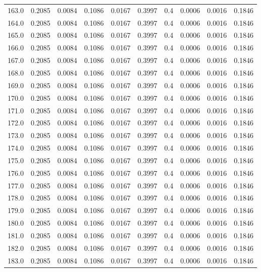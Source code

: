 \begin{longtable}{lrrrrrrrrr}
163.0 & 0.2085 & 0.0084 & 0.1086 & 0.0167 & 0.3997 & 0.4 & 0.0006 & 0.0016 & 0.1846 \\
164.0 & 0.2085 & 0.0084 & 0.1086 & 0.0167 & 0.3997 & 0.4 & 0.0006 & 0.0016 & 0.1846 \\
165.0 & 0.2085 & 0.0084 & 0.1086 & 0.0167 & 0.3997 & 0.4 & 0.0006 & 0.0016 & 0.1846 \\
166.0 & 0.2085 & 0.0084 & 0.1086 & 0.0167 & 0.3997 & 0.4 & 0.0006 & 0.0016 & 0.1846 \\
167.0 & 0.2085 & 0.0084 & 0.1086 & 0.0167 & 0.3997 & 0.4 & 0.0006 & 0.0016 & 0.1846 \\
168.0 & 0.2085 & 0.0084 & 0.1086 & 0.0167 & 0.3997 & 0.4 & 0.0006 & 0.0016 & 0.1846 \\
169.0 & 0.2085 & 0.0084 & 0.1086 & 0.0167 & 0.3997 & 0.4 & 0.0006 & 0.0016 & 0.1846 \\
170.0 & 0.2085 & 0.0084 & 0.1086 & 0.0167 & 0.3997 & 0.4 & 0.0006 & 0.0016 & 0.1846 \\
171.0 & 0.2085 & 0.0084 & 0.1086 & 0.0167 & 0.3997 & 0.4 & 0.0006 & 0.0016 & 0.1846 \\
172.0 & 0.2085 & 0.0084 & 0.1086 & 0.0167 & 0.3997 & 0.4 & 0.0006 & 0.0016 & 0.1846 \\
173.0 & 0.2085 & 0.0084 & 0.1086 & 0.0167 & 0.3997 & 0.4 & 0.0006 & 0.0016 & 0.1846 \\
174.0 & 0.2085 & 0.0084 & 0.1086 & 0.0167 & 0.3997 & 0.4 & 0.0006 & 0.0016 & 0.1846 \\
175.0 & 0.2085 & 0.0084 & 0.1086 & 0.0167 & 0.3997 & 0.4 & 0.0006 & 0.0016 & 0.1846 \\
176.0 & 0.2085 & 0.0084 & 0.1086 & 0.0167 & 0.3997 & 0.4 & 0.0006 & 0.0016 & 0.1846 \\
177.0 & 0.2085 & 0.0084 & 0.1086 & 0.0167 & 0.3997 & 0.4 & 0.0006 & 0.0016 & 0.1846 \\
178.0 & 0.2085 & 0.0084 & 0.1086 & 0.0167 & 0.3997 & 0.4 & 0.0006 & 0.0016 & 0.1846 \\
179.0 & 0.2085 & 0.0084 & 0.1086 & 0.0167 & 0.3997 & 0.4 & 0.0006 & 0.0016 & 0.1846 \\
180.0 & 0.2085 & 0.0084 & 0.1086 & 0.0167 & 0.3997 & 0.4 & 0.0006 & 0.0016 & 0.1846 \\
181.0 & 0.2085 & 0.0084 & 0.1086 & 0.0167 & 0.3997 & 0.4 & 0.0006 & 0.0016 & 0.1846 \\
182.0 & 0.2085 & 0.0084 & 0.1086 & 0.0167 & 0.3997 & 0.4 & 0.0006 & 0.0016 & 0.1846 \\
183.0 & 0.2085 & 0.0084 & 0.1086 & 0.0167 & 0.3997 & 0.4 & 0.0006 & 0.0016 & 0.1846 \\

\end{longtable}
